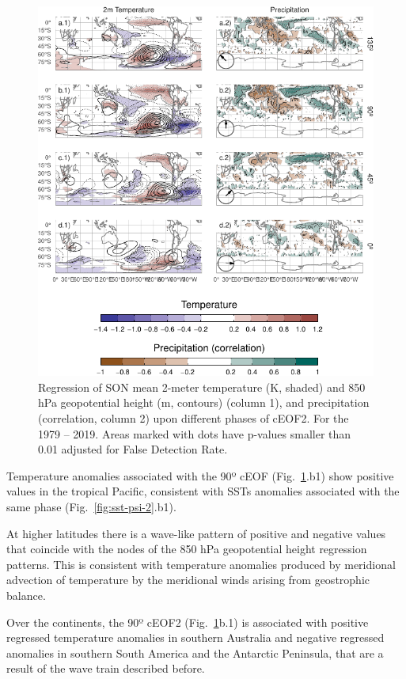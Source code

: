 \documentclass[pdflatex,sn-basic]{sn-jnl}
\theoremstyle{thmstyleone}%
\theoremstyle{thmstyletwo}%
\theoremstyle{thmstylethree}%
\begin{document}
\begin{figure}
\centering
\includegraphics{../figures/pp-temp-2-1.pdf}
\caption{\label{fig:pp-temp-2}Regression of SON mean 2-meter temperature (K, shaded) and 850 hPa geopotential height (m, contours) (column 1), and precipitation (correlation, column 2) upon different phases of cEOF2. For the 1979 -- 2019. Areas marked with dots have p-values smaller than 0.01 adjusted for False Detection Rate.}
\end{figure}

Temperature anomalies associated with the 90º cEOF (Fig.~\ref{fig:pp-temp-2}.b1) show positive values in the tropical Pacific, consistent with SSTs anomalies associated with the same phase (Fig.~\ref{fig:sst-psi-2}.b1).

At higher latitudes there is a wave-like pattern of positive and negative values that coincide with the nodes of the 850 hPa geopotential height regression patterns.
This is consistent with temperature anomalies produced by meridional advection of temperature by the meridional winds arising from geostrophic balance.

Over the continents, the 90º cEOF2 (Fig.~\ref{fig:pp-temp-2}b.1) is associated with positive regressed temperature anomalies in southern Australia and negative regressed anomalies in southern South America and the Antarctic Peninsula, that are a result of the wave train described before.
\end{document}
